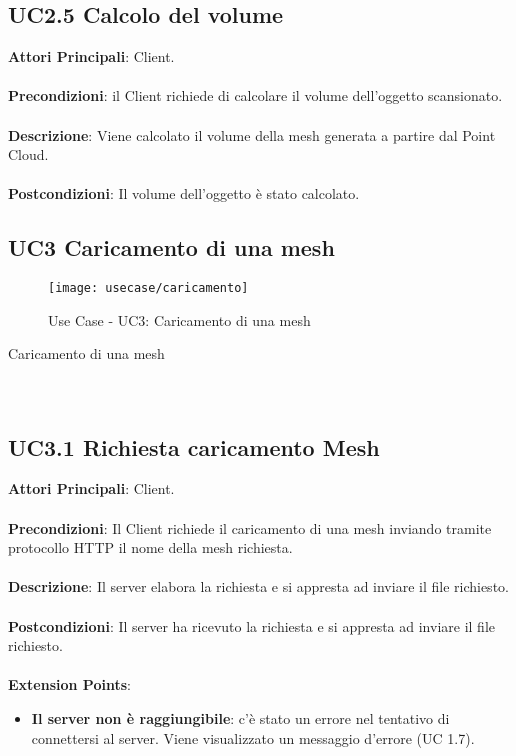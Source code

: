 \subsection{UC2.5 Calcolo del volume}
\textbf{Attori Principali}: Client.
\\\\ \textbf{Precondizioni}: il Client richiede di calcolare il volume dell'oggetto scansionato.
\\\\ \textbf{Descrizione}: Viene calcolato il volume della mesh generata a partire dal Point Cloud.
\\\\ \textbf{Postcondizioni}: Il volume dell'oggetto è stato calcolato.


\subsection{UC3 Caricamento di una mesh}
\begin{figure}[!h] 
    \centering 
    \texttt{[image: usecase/caricamento]} 
    \caption{Use Case - UC3: Caricamento di una mesh}
\end{figure}

\begin{usecase}{3}{Caricamento di una mesh}
\\ 
\\ 
\\ 
\label{uc:caricamento}
\end{usecase}

\subsection{UC3.1 Richiesta caricamento Mesh}
\textbf{Attori Principali}: Client.
\\\\ \textbf{Precondizioni}: Il Client richiede il caricamento di una mesh inviando tramite protocollo HTTP il nome della mesh richiesta.
\\\\ \textbf{Descrizione}: Il server elabora la richiesta e si appresta ad inviare il file richiesto.
\\\\ \textbf{Postcondizioni}: Il server ha ricevuto la richiesta e si appresta ad inviare il file richiesto.
\\\\ \textbf{Extension Points}:
\begin{itemize}
\item \textbf{Il server non è raggiungibile}: c'è stato un errore nel tentativo di connettersi al server. Viene visualizzato un messaggio d'errore (UC 1.7).
\end{itemize}

